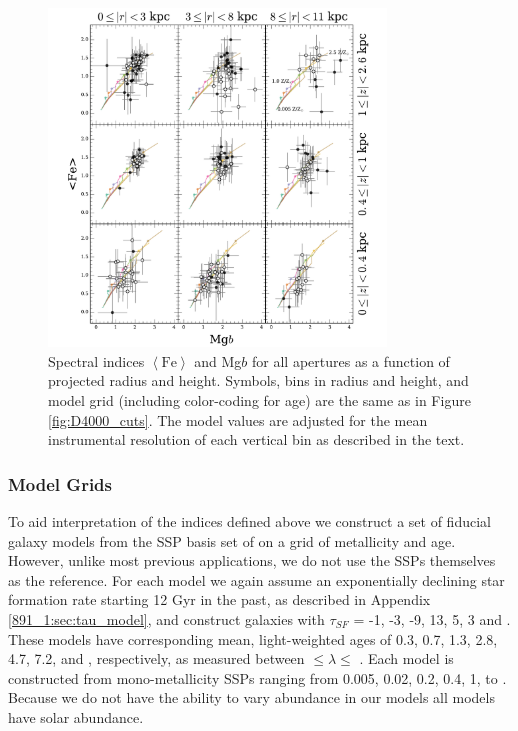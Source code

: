 \begin{figure}[t]
  \centering
  \includegraphics[width=0.8\textwidth]{891_1/figs/Mgb_multires.pdf}
  \caption[Mg$b$ vs $\left<\mathrm{Fe}\right>$ in radius and height
  bins]{\label{fig:Mgb_cuts}\fixspacing Spectral indices
    $\left<\mathrm{Fe}\right>$ and Mg$b$ for all apertures as a
    function of projected radius and height. Symbols, bins in radius
    and height, and model grid (including color-coding for age) are
    the same as in Figure \ref{fig:D4000_cuts}. The model values are
    adjusted for the mean instrumental resolution of each vertical bin
    as described in the text.}
\end{figure}



\subsubsection{Model Grids}
\label{891_1:sec:fidgrid}

To aid interpretation of the indices defined above we construct a set
of fiducial galaxy models from the SSP basis set of \citet{Bruzual03}
on a grid of metallicity and age. However, unlike most previous
applications, we do not use the SSPs themselves as the reference. For
each model we again assume an exponentially declining star formation
rate starting 12 Gyr in the past, as described in Appendix
\ref{891_1:sec:tau_model}, and construct galaxies with $\tau_{SF}$ = -1, -3,
-9, 13, 5, 3 and . These models have corresponding mean,
light-weighted ages of 0.3, 0.7, 1.3, 2.8, 4.7, 7.2, and
, respectively, as measured between 
$\leq\lambda\leq$ . Each model is constructed from
mono-metallicity SSPs ranging from 0.005, 0.02, 0.2, 0.4, 1, to
. Because we do not have the ability to vary abundance
in our models \citep[as done, for example, by][]{Trager08} all models
have solar abundance. 

